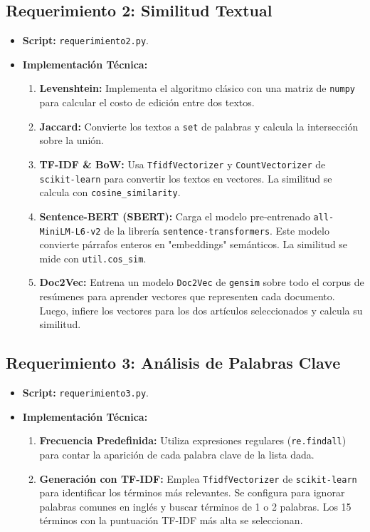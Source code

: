\documentclass[a4paper, 11pt]{article}
\begin{document}
\subsection{Requerimiento 2: Similitud Textual}
\begin{itemize}
    \item \textbf{Script:} \texttt{requerimiento2.py}.
    \item \textbf{Implementación Técnica:}
    \begin{enumerate}
        \item \textbf{Levenshtein:} Implementa el algoritmo clásico con una matriz de \texttt{numpy} para calcular el costo de edición entre dos textos.
        \item \textbf{Jaccard:} Convierte los textos a \texttt{set} de palabras y calcula la intersección sobre la unión.
        \item \textbf{TF-IDF \& BoW:} Usa \texttt{TfidfVectorizer} y \texttt{CountVectorizer} de \texttt{scikit-learn} para convertir los textos en vectores. La similitud se calcula con \texttt{cosine_similarity}.
        \item \textbf{Sentence-BERT (SBERT):} Carga el modelo pre-entrenado \texttt{all-MiniLM-L6-v2} de la librería \texttt{sentence-transformers}. Este modelo convierte párrafos enteros en "embeddings" semánticos. La similitud se mide con \texttt{util.cos_sim}.
        \item \textbf{Doc2Vec:} Entrena un modelo \texttt{Doc2Vec} de \texttt{gensim} sobre todo el corpus de resúmenes para aprender vectores que representen cada documento. Luego, infiere los vectores para los dos artículos seleccionados y calcula su similitud.
    \end{enumerate}
\end{itemize}

\subsection{Requerimiento 3: Análisis de Palabras Clave}
\begin{itemize}
    \item \textbf{Script:} \texttt{requerimiento3.py}.
    \item \textbf{Implementación Técnica:}
    \begin{enumerate}
        \item \textbf{Frecuencia Predefinida:} Utiliza expresiones regulares (\texttt{re.findall}) para contar la aparición de cada palabra clave de la lista dada.
        \item \textbf{Generación con TF-IDF:} Emplea \texttt{TfidfVectorizer} de \texttt{scikit-learn} para identificar los términos más relevantes. Se configura para ignorar palabras comunes en inglés y buscar términos de 1 o 2 palabras. Los 15 términos con la puntuación TF-IDF más alta se seleccionan.
    \end{enumerate}
\end{itemize}
\end{document}
